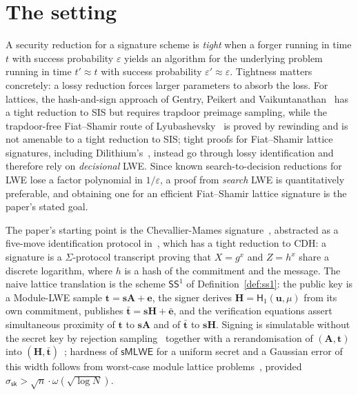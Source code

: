 \documentclass{aicr-conjecture}
\newcommand{\smlwe}{\mathsf{sMLWE}}
\newcommand{\SSone}{\mathsf{SS}^1}
\newcommand{\ssk}{\sigma_{\mathsf{sk}}}
\newcommand{\Hone}{\mathsf{H}_1}
\begin{document}
\section{The setting}\label{sec:setting}

A security reduction for a signature scheme is \emph{tight} when a
forger running in time $t$ with success probability $\varepsilon$
yields an algorithm for the underlying problem running in time
$t' \approx t$ with success probability $\varepsilon' \approx
\varepsilon$. Tightness matters concretely: a lossy reduction forces
larger parameters to absorb the loss. For lattices, the hash-and-sign
approach of Gentry, Peikert and Vaikuntanathan~\cite{GPV08} has a tight
reduction to SIS but requires trapdoor preimage sampling, while the
trapdoor-free Fiat--Shamir route of Lyubashevsky~\cite{Lyu09,Lyu12} is
proved by rewinding and is not amenable to a tight reduction to SIS;
tight proofs for Fiat--Shamir lattice signatures, including
Dilithium's~\cite{KLS18}, instead go through lossy identification and
therefore rely on \emph{decisional} LWE. Since known
search-to-decision reductions for LWE lose a factor polynomial in
$1/\varepsilon$, a proof from \emph{search} LWE is quantitatively
preferable, and obtaining one for an efficient Fiat--Shamir lattice
signature is the paper's stated goal.

The paper's starting point is the Chevallier-Mames
signature~\cite{Che05}, abstracted as a five-move identification
protocol in~\cite{KLP17}, which has a tight reduction to CDH: a
signature is a $\Sigma$-protocol transcript proving that $X = g^x$ and
$Z = h^x$ share a discrete logarithm, where $h$ is a hash of the
commitment and the message. The naive lattice translation is the scheme
$\SSone$ of Definition~\ref{def:ss1}: the public key is a Module-LWE
sample $\mathbf{t} = \mathbf{s}\mathbf{A} + \mathbf{e}$, the signer
derives $\mathbf{H} = \Hone(\mathbf{u},\mu)$ from its own commitment,
publishes $\bar{\mathbf{t}} = \mathbf{s}\mathbf{H} + \bar{\mathbf{e}}$,
and the verification equations assert simultaneous proximity of
$\mathbf{t}$ to $\mathbf{s}\mathbf{A}$ and of $\bar{\mathbf{t}}$ to
$\mathbf{s}\mathbf{H}$. Signing is simulatable without the secret key
by rejection sampling~\cite{Lyu12} together with a rerandomisation of
$(\mathbf{A},\mathbf{t})$ into
$(\mathbf{H},\bar{\mathbf{t}})$~\cite{GMPW20}; hardness of $\smlwe$ for
a uniform secret and a Gaussian error of this width follows from
worst-case module lattice problems~\cite{LS15}, provided
$\ssk > \sqrt{n}\cdot\omega(\sqrt{\log N})$.
\end{document}
